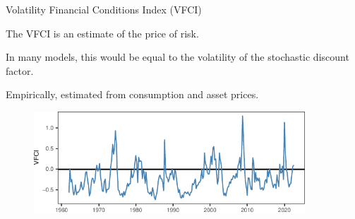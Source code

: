 \begin{frame}{Volatility Financial Conditions Index (VFCI)}

    \vspace{0.25cm}

    The VFCI is an estimate of the price of risk.

    In many models, this would be equal to the volatility of the stochastic discount factor.

    Empirically, estimated from consumption and asset prices.

    \vspace{0.25cm}
    
    \begin{figure}
        \includegraphics[height = 1.5in]{figs/fig2_vfci.pdf}
    \end{figure}
    
\end{frame}